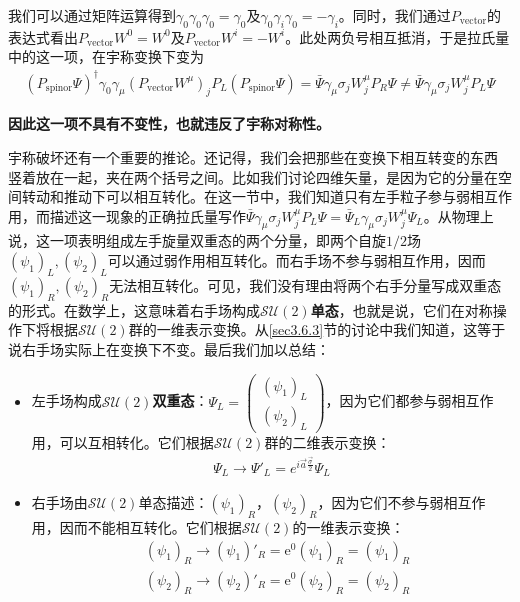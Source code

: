我们可以通过矩阵运算得到$\gamma_0\gamma_0\gamma_0=\gamma_0$及$\gamma_0\gamma_i\gamma_0=-\gamma_i$。同时，我们通过$P_\text{vector}$的表达式看出$P_\text{vector}W^0 = W^0$及$P_\text{vector}W^i = -W^i$。此处两负号相互抵消，于是拉氏量中的这一项，在宇称变换下变为
\begin{align}
(P_\text{spinor}\Psi)^\dag\gamma_0\gamma_\mu(P_\text{vector}W^\mu)_jP_L(P_\text{spinor}\Psi)=\bar{\Psi}\gamma_\mu\sigma_j W_j^\mu P_R\Psi\ne\bar{\Psi}\gamma_\mu\sigma_j W_j^\mu P_L\Psi
\label{equ7.110}
\end{align}

\textbf{因此这一项不具有不变性，也就违反了宇称对称性。}

宇称破坏还有一个重要的推论。还记得，我们会把那些在变换下相互转变的东西%
%
竖着放在一起，夹在两个括号之间。比如我们讨论四维矢量，是因为它的分量在空间转动和推动下可以相互转化。在这一节中，我们知道只有左手粒子参与弱相互作用，而描述这一现象的正确拉氏量写作$\bar{\Psi}\gamma_\mu\sigma_j W_j^\mu P_L\Psi=\bar{\Psi}_L\gamma_\mu\sigma_j W_j^\mu\Psi_L$。从物理上说，这一项表明组成左手旋量双重态的两个分量，即两个自旋$1/2$场$(\psi_1)_L,(\psi_2)_L$可以通过弱作用相互转化。而右手场不参与弱相互作用，因而$(\psi_1)_R,(\psi_2)_R$无法相互转化。可见，我们没有理由将两个右手分量写成双重态的形式。在数学上，这意味着右手场构成$\mathcal{SU}(2)${\bfseries 单态}，也就是说，它们在对称操作下将根据$\mathcal{SU}(2)$群的一维表示变换。从\ref{sec3.6.3}节的讨论中我们知道，这等于说右手场实际上在变换下不变。最后我们加以总结：
\begin{itemize}
\item 左手场构成$\mathcal{SU}(2)${\bfseries 双重态}：$\Psi_L=\begin{pmatrix}(\psi_1)_L\\ (\psi_2)_L\end{pmatrix}$，因为它们都参与弱相互作用，可以互相转化。它们根据$\mathcal{SU}(2)$群的二维表示变换：
\begin{align}
\Psi_L\rightarrow\Psi'_L=e^{i\vec{a}\frac{\vec{\sigma}}{2}}\Psi_L
\label{equ7.111}
\end{align}
\item 右手场由$\mathcal{SU}(2)$单态描述：$(\psi_1)_R$，$(\psi_2)_R$，因为它们不参与弱相互作用，因而不能相互转化。它们根据$\mathcal{SU}(2)$的一维表示变换：
\begin{align}
&(\psi_1)_R\rightarrow (\psi_1)'_R=\mathrm{e}^0(\psi_1)_R=(\psi_1)_R\nonumber\\
&(\psi_2)_R\rightarrow (\psi_2)'_R=\mathrm{e}^0(\psi_2)_R=(\psi_2)_R
\label{equ7.112}
\end{align}
\end{itemize}

